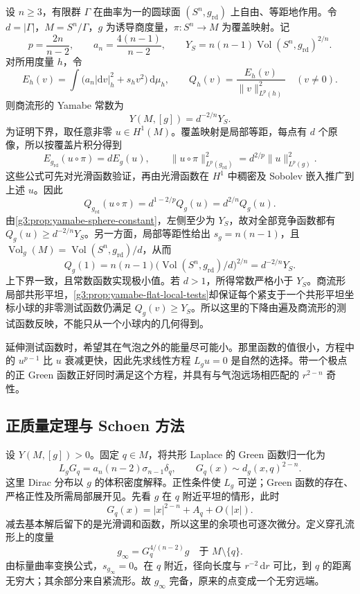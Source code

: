 \begin{example}\label{g3:exm:yamabe-spherical-quotient}
	设 \(n\ge3\)，有限群 \(\Gamma\) 在曲率为一的圆球面 \((S^n,g_{\mathrm{rd}})\) 上自由、等距地作用。令 \(d=|\Gamma|\)，\(M=S^n/\Gamma\)，\(g\) 为诱导商度量，\(\pi:S^n\to M\) 为覆盖映射。记
	\[
		p=\frac{2n}{n-2},\qquad a_n=\frac{4(n-1)}{n-2},
		\qquad Y_S=n(n-1)\operatorname{Vol}(S^n,g_{\mathrm{rd}})^{2/n}.
	\]
	对所用度量 \(h\)，令
	\[
		E_h(v)=\int\bigl(a_n|\mathrm dv|_h^2+s_hv^2\bigr)\,\mathrm d\mu_h,
		\qquad Q_h(v)=\frac{E_h(v)}{\|v\|_{L^p(h)}^2}\quad(v\ne0).
	\]
	则商流形的 Yamabe 常数为
	\[
		Y(M,[g])=d^{-2/n}Y_S.
	\]
	为证明下界，取任意非零 \(u\in H^1(M)\)。覆盖映射是局部等距，每点有 \(d\) 个原像，所以按覆盖片积分得到
	\[
		E_{g_{\mathrm{rd}}}(u\circ\pi)=dE_g(u),
		\qquad
		\|u\circ\pi\|_{L^p(g_{\mathrm{rd}})}^2
		=d^{2/p}\|u\|_{L^p(g)}^2.
	\]
	这些公式可先对光滑函数验证，再由光滑函数在 \(H^1\) 中稠密及 Sobolev 嵌入推广到上述 \(u\)。因此
	\[
		Q_{g_{\mathrm{rd}}}(u\circ\pi)=d^{1-2/p}Q_g(u)
		=d^{2/n}Q_g(u).
	\]
	由\cref{g3:prop:yamabe-sphere-constant}，左侧至少为 \(Y_S\)，故对全部竞争函数都有 \(Q_g(u)\ge d^{-2/n}Y_S\)。另一方面，局部等距性给出 \(s_g=n(n-1)\)，且 \(\operatorname{Vol}_g(M)=\operatorname{Vol}(S^n,g_{\mathrm{rd}})/d\)，从而
	\[
		Q_g(1)=n(n-1)\bigl(\operatorname{Vol}(S^n,g_{\mathrm{rd}})/d\bigr)^{2/n}
		=d^{-2/n}Y_S.
	\]
	上下界一致，且常数函数实现极小值。若 \(d>1\)，所得常数严格小于 \(Y_S\)。商流形局部共形平坦，\cref{g3:prop:yamabe-flat-local-tests}却保证每个紧支于一个共形平坦坐标小球的非零测试函数仍满足 \(Q_g(v)\ge Y_S\)。所以这里的下降由遍及商流形的测试函数反映，不能只从一个小球内的几何得到。
\end{example}

\ProseParagraphBreak
延伸测试函数时，希望其在气泡之外的能量尽可能小。那里函数的值很小，方程中的 \(u^{p-1}\) 比 \(u\) 衰减更快，因此先求线性方程 \(L_gu=0\) 是自然的选择。带一个极点的正 Green 函数正好同时满足这个方程，并具有与气泡远场相匹配的 \(r^{2-n}\) 奇性。

\subsection{正质量定理与 Schoen 方法}
\label{g3:subsec:2405:03}
设 \(Y(M,[g])>0\)。固定 \(q\in M\)，将共形 Laplace 的 Green 函数归一化为
\begin{equation}\label{g3:eq:yamabe-green-normalization}
	L_gG_q=a_n(n-2)\sigma_{n-1}\delta_q,
	\qquad G_q(x)\sim d_g(x,q)^{2-n}.
\end{equation}
这里 Dirac 分布以 \(g\) 的体积密度解释。正性条件使 \(L_g\) 可逆；Green 函数的存在、严格正性及所需局部展开见\cite[引理6.1、6.4，定理6.5]{LeeParker1987Yamabe}。先看 \(g\) 在 \(q\) 附近平坦的情形，此时
\[
	G_q(x)=|x|^{2-n}+A_q+O(|x|).
\]
减去基本解后留下的是光滑调和函数，所以这里的余项也可逐次微分。定义穿孔流形上的度量
\begin{equation}\label{g3:eq:yamabe-green-blowup}
	g_\infty=G_q^{4/(n-2)}g
	\quad\text{于 }M\setminus\{q\}.
\end{equation}
由标量曲率变换公式，\(s_{g_\infty}=0\)。在 \(q\) 附近，径向长度与 \(r^{-2}\,\mathrm dr\) 可比，到 \(q\) 的距离无穷大；其余部分来自紧流形。故 \(g_\infty\) 完备，原来的点变成一个无穷远端。

